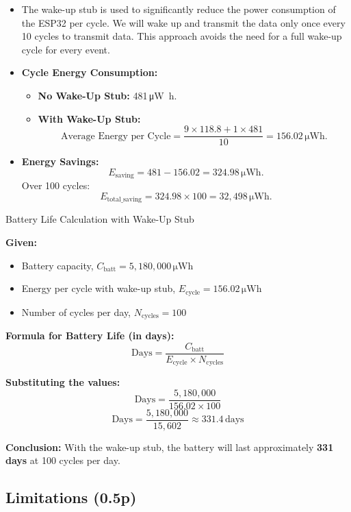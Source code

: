 \documentclass[A4,10pt]{article}
\begin{document}
\begin{itemize}
    \item The wake-up stub is used to significantly reduce the power consumption of the ESP32 per cycle. We will wake up and transmit the data only once every 10 cycles to transmit data. This approach avoids the need for a full wake-up cycle for every event.
    
    \item \textbf{Cycle Energy Consumption:}
    \begin{itemize}
      \item \textbf{No Wake-Up Stub:} 481\,\si{\micro\watt\hour}.
      \item \textbf{With Wake-Up Stub:} 
      \[
      \text{Average Energy per Cycle} = \frac{9 \times 118.8 + 1 \times 481}{10} = 156.02\,\si{\micro\watt\hour}.
      \]
    \end{itemize}
    
    \item \textbf{Energy Savings:}
    \[
    E_{\mathrm{saving}} = 481 - 156.02 = 324.98\,\si{\micro\watt\hour}.
    \]
    Over 100 cycles:
    \[
    E_{\mathrm{total\_saving}} = 324.98 \times 100 = 32{,}498\,\si{\micro\watt\hour}.
    \]
\end{itemize}

Battery Life Calculation with Wake-Up Stub

\textbf{Given:}
\begin{itemize}
    \item Battery capacity, \( C_\mathrm{batt} = 5{,}180{,}000 \, \si{\micro\watt\hour} \)
    \item Energy per cycle with wake-up stub, \( E_{\mathrm{cycle}} = 156.02 \, \si{\micro\watt\hour} \)
    \item Number of cycles per day, \( N_\mathrm{cycles} = 100 \)
\end{itemize}

\textbf{Formula for Battery Life (in days):}
\[
\text{Days} = \frac{C_{\mathrm{batt}}}{E_{\mathrm{cycle}} \times N_{\mathrm{cycles}}}
\]

\textbf{Substituting the values:}
\[
\text{Days} = \frac{5{,}180{,}000}{156.02 \times 100}
\]
\[
\text{Days} = \frac{5{,}180{,}000}{15{,}602} \approx 331.4 \, \text{days}
\]

\textbf{Conclusion:} With the wake-up stub, the battery will last approximately \textbf{331 days} at 100 cycles per day.

\subsection{Limitations (0.5p)}
\end{document}
